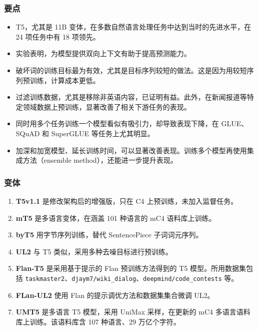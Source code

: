 \subsubsection{要点}
\begin{keypoint}
\begin{itemize}
\item T5，尤其是 11B 变体，在多数自然语言处理任务中达到当时的先进水平，在 24 项任务中有 18 项领先。
\item 实验表明，为模型提供双向上下文有助于提高预测能力。
\item 破坏词的训练目标最为有效，尤其是目标序列较短的做法。这是因为用较短序列预训练，计算成本更低。
\item 过滤训练数据，尤其是移除非英语内容，已证明有益。此外，在新闻报道等特定领域数据上预训练，显著改善了相关下游任务的表现。
\item 同时用多个任务训练一个模型看似有吸引力，却导致表现下降，在 GLUE、SQuAD 和 SuperGLUE 等任务上尤其明显。
\item 加深和加宽模型、延长训练时间，可以显著改善表现。训练多个模型再使用集成方法（ensemble method），还能进一步提升表现。
\end{itemize}
\end{keypoint}

\subsubsection{变体}
\begin{enumerate}
\item \textbf{T5v1.1} 是修改架构后的增强版，只在 C4 上预训练，未加入监督任务。
\item \textbf{mT5} 是多语言变体，在涵盖 101 种语言的 mC4 语料库上训练。
\item \textbf{byT5} 用字节序列训练，替代 SentencePiece 子词词元序列。
\item \textbf{UL2} 与 T5 类似，采用多种去噪目标进行预训练。
\item \textbf{Flan-T5} 是采用基于提示的 Flan 预训练方法得到的 T5 模型。所用数据集包括 \texttt{taskmaster2}、\texttt{djaym7/wiki\_dialog}、\texttt{deepmind/code\_contests} 等。
\item \textbf{FLan-UL2} 使用 Flan 的提示调优方法和数据集集合微调 UL2。
\item \textbf{UMT5} 是多语言 T5 模型，采用 UniMax 采样，在更新的 mC4 多语言语料库上训练。该语料库含 107 种语言、29 万亿个字符。
\end{enumerate}
